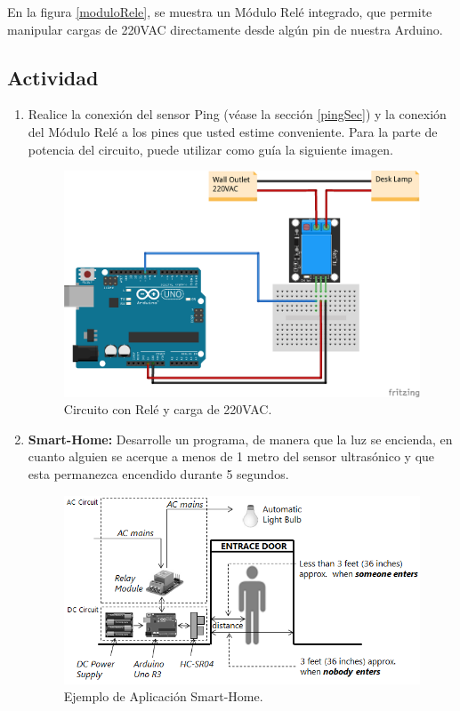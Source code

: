 \documentclass[letterpaper, 10pt]{report}
\begin{document}
En la figura \ref{moduloRele}, se muestra un Módulo Relé integrado, que permite manipular cargas de 220VAC directamente desde algún pin de nuestra Arduino.

\subsection{Actividad}

\begin{enumerate}
	\item Realice la conexión del sensor Ping (véase la sección \ref{pingSec}) y la conexión del Módulo Relé a los pines que usted estime conveniente. Para la parte de potencia del circuito, puede utilizar como guía la siguiente imagen. 
	
\begin{figure}[h]
\centering
\includegraphics[scale=0.15]{relay.png}
\caption{Circuito con Relé y carga de 220VAC. \label{rele}}
\end{figure}


\item {\bf Smart-Home:} Desarrolle un programa, de manera que la luz se encienda, en cuanto alguien se acerque a menos de 1 metro del sensor ultrasónico y que esta permanezca encendido durante 5 segundos.

\begin{figure}[h]
\centering
\includegraphics[scale=0.6]{aplicacion.png}
\caption{Ejemplo de Aplicación Smart-Home.}
\end{figure}

\end{enumerate}
\end{document}
